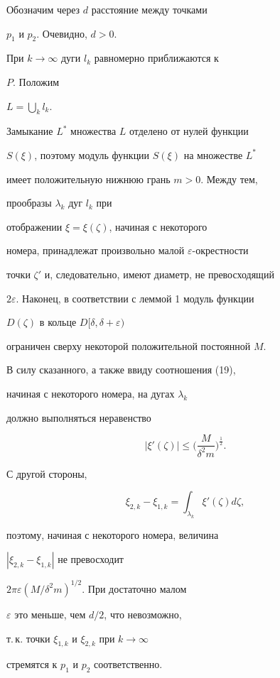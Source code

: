 \begin{pf}
\noindent{}Обозначим через $d$ расстояние между точками 


$p_{1}$ и $p_{2}$. Очевидно, $d>0$.  


При $k\to\infty$ дуги $l_{k}$ равномерно приближаются к 


$P$. Положим


$L=\bigcup\limits_{k}l_{k}$.


Замыкание $L^{*}$ множества $L$ отделено от нулей функции 


$S(\xi)$, поэтому модуль функции $S(\xi)$ на множестве $L^{*}$ 


имеет положительную нижнюю грань $m>0$. Между тем, 


прообразы $\lambda_{k}$ дуг $l_{k}$ при 


отображении $\xi=\xi(\zeta)$, начиная с некоторого 


номера, принадлежат произвольно малой $\varepsilon$-окрестности 


точки $\zeta'$ и, следовательно, имеют диаметр, не превосходящий 


$2\varepsilon$. Наконец, в соответствии с леммой 1 модуль функции 


$D(\zeta)$ в кольце $D[\delta,\delta+\varepsilon)$ 


ограничен сверху некоторой положительной постоянной $M$. 


В силу сказанного, а также ввиду соотношения (19), 


начиная с некоторого номера, на дугах $\lambda_{k}$ 


должно выполняться неравенство


$$


|\xi'(\zeta)|\le \bigg(\frac{M}{\delta^{2}m}\bigg)^{\frac{1}{2}}.


$$


С другой стороны,


$$


\xi_{2,k}-\xi_{1,k}=\int_{\lambda_{k}}\xi'(\zeta)d\zeta,


$$


поэтому, начиная с некоторого номера, величина 


$|\xi_{2,k}-\xi_{1,k}|$ не превосходит 


$2\pi\varepsilon(M/\delta^{2} m)^{1/2}$. При достаточно малом


$\varepsilon$ это меньше, чем $d/2$, что невозможно, 


т.\,к. точки $\xi_{1,k}$ и $\xi_{2,k}$ при $k\to\infty$


стремятся к $p_{1}$ и $p_{2}$ соответственно.






\end{pf}
